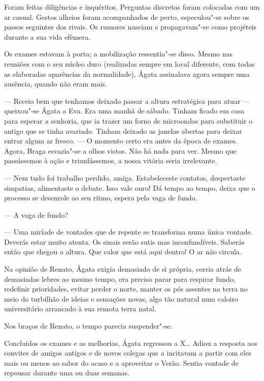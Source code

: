 Foram feitas diligências e inquéritos. Perguntas discretas foram
colocadas com um ar casual. Gestos alheios foram acompanhados de
perto, especulou"-se sobre os passos seguintes dos rivais. Os rumores
nasciam e propagavam"-se como projéteis durante a sua vida efêmera.

Os exames estavam à porta; a mobilização ressentia"-se disso. Mesmo nas
reuniões com o seu núcleo duro (realizadas sempre em local diferente,
com todas as elaboradas aparências da normalidade), Ágata assinalava
agora sempre uma ausência, quando não eram mais.

--- Receio bem que tenhamos deixado passar a altura estratégica para
  atuar --- queixou"-se Ágata a Eva. Era uma manhã de sábado. Tinham
  ficado em casa para esperar a senhoria, que ia trazer um forno de
  microondas para substituir o antigo que se tinha avariado. Tinham
  deixado as janelas abertas para deixar entrar algum ar fresco. --- O
  momento certo era antes da época de exames. Agora, Braga esvazia"-se a
  olhos vistos. Não há nada para ver. Mesmo que passássemos à ação e
  triunfássemos, a nossa vitória seria irrelevante.

--- Nem tudo foi trabalho perdido, amiga. Estabeleceste contatos,
  despertaste simpatias, alimentaste o debate. Isso vale ouro! Dá tempo
  ao tempo, deixa que o processo se desenrole ao seu ritmo, espera
  pela vaga de fundo.

--- A vaga de fundo?

--- Uma miríade de vontades que de repente se transforma numa única
  vontade. Deverás estar muito atenta. Os sinais serão sutis mas
  inconfundíveis. Saberás então que chegou a altura. Que calor que está
  aqui dentro! O ar não circula.

Na opinião de Renato, Ágata exigia demasiado de si própria, corria atrás
de demasiadas lebres ao mesmo tempo, era preciso parar para respirar
fundo, redefinir prioridades, evitar perder o norte, manter os pés
assentes na terra no meio do turbilhão de ideias e sensações novas, algo
tão natural num caloiro universitário arrancado à sua remota terra
natal.

Nos braços de Renato, o tempo parecia suspender"-se.

Concluídos os exames e as melhorias, Ágata regressou a X\ldots{} Adiou a
resposta aos convites de amigos antigos e de novos colegas que a
incitavam a partir com eles mais ou menos ao sabor do acaso e a
aproveitar o Verão. Sentia vontade de repousar durante uma ou duas
semanas.

